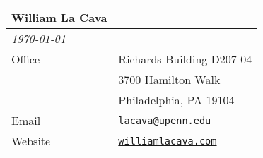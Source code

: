 \noindent \begin{tabularx}{\textwidth}{ll}
{\large \bf William La Cava} \\ \hline
{\it \today} \\
Office & Richards Building D207-04 \\
&3700 Hamilton Walk \\ 
&Philadelphia, PA 19104 \\ 
Email & \texttt{lacava@upenn.edu} \\
Website & \href{http://williamlacava.com}{\texttt{williamlacava.com}} \\ 

\end{tabularx}
